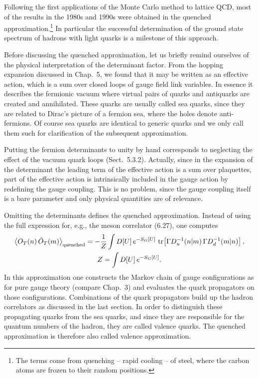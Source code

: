Following the first applications of the Monte Carlo method to lattice QCD, most
of the results in the 1980s and 1990s were obtained in the quenched
approximation.\footnote{The terms come from quenching -- rapid cooling -- of
steel, where the carbon atoms are frozen to their random positions.} In
particular the successful determination of the ground state spectrum of hadrons
with light quarks is a milestone of this approach.

Before discussing the quenched approximation, let us briefly remind ourselves
of the physical interpretation of the determinant factor. From the hopping
expansion discussed in Chap.~5, we found that it may be written as an effective
action, which is a sum over closed loops of gauge field link variables. In
essence it describes the fermionic vacuum where virtual pairs of quarks and
antiquarks are created and annihilated. These quarks are usually called sea
quarks, since they are related to Dirac's picture of a fermion sea, where the
holes denote anti-fermions. Of course sea quarks are identical to generic
quarks and we only call them such for clarification of the subsequent
approximation.

Putting the fermion determinants to unity by hand corresponds to neglecting the
effect of the vacuum quark loops (Sect.~5.3.2). Actually, since in the expansion
of the determinant the leading term of the effective action is a sum over
plaquettes, part of the effective action is intrinsically included in the gauge
action by redefining the gauge coupling. This is no problem, since the gauge
coupling itself is a bare parameter and only physical quantities are of
relevance.

Omitting the determinants defines the quenched approximation. Instead of using
the full expression for, e.g., the meson correlator (6.27), one computes
\begin{equation}
  \begin{gathered}
    \big\langle O_T(n)\, \bar{O}_T(m) \big\rangle_{\mathrm{quenched}}
    = -\frac{1}{Z}\int D[U]\, e^{-S_G[U]}\,
      \operatorname{tr}\!\left[ \Gamma D_u^{-1}(n|m)\, \Gamma D_d^{-1}(m|n) \right], \\
    Z = \int D[U]\, e^{-S_G[U]} .
  \end{gathered}
\end{equation}
In this approximation one constructs the Markov chain of gauge configurations
as for pure gauge theory (compare Chap.~3) and evaluates the quark propagators
on those configurations. Combinations of the quark propagators build up the
hadron correlators as discussed in the last section. In order to distinguish
these propagating quarks from the sea quarks, and since they are responsible
for the quantum numbers of the hadron, they are called valence quarks. The
quenched approximation is therefore also called valence approximation.

